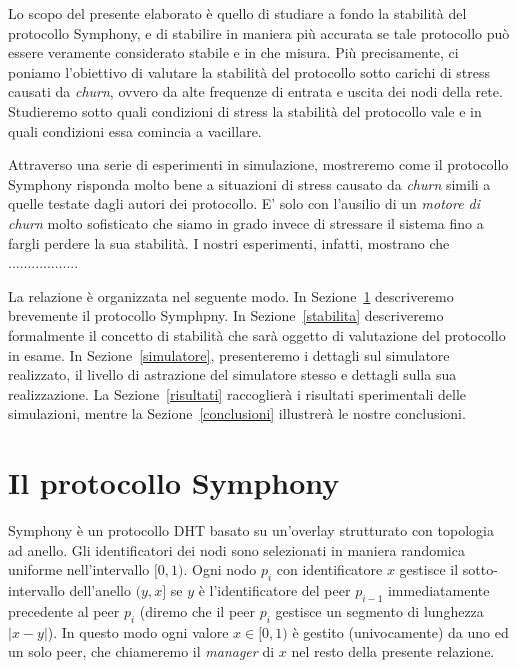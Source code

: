 \documentclass[prodmode,acmtap]{acmlarge}
\begin{document}
Lo scopo del presente elaborato è quello di studiare a fondo la stabilità del protocollo Symphony, e di stabilire in maniera più accurata se tale protocollo può essere veramente considerato stabile e in che misura. Più precisamente, ci poniamo l'obiettivo di valutare la stabilità del protocollo sotto carichi di stress causati da \emph{churn}, ovvero da alte frequenze di entrata e uscita dei nodi della rete. Studieremo sotto quali condizioni di stress la stabilità del protocollo vale e in quali condizioni essa comincia a vacillare.

Attraverso una serie di esperimenti in simulazione, mostreremo come il protocollo Symphony risponda molto bene a situazioni di stress causato da \emph{churn} simili a quelle testate dagli autori dei protocollo. E' solo con l'ausilio di un \emph{motore di churn} molto sofisticato che siamo in grado invece di stressare il sistema fino a fargli perdere la sua stabilità. I nostri esperimenti, infatti, mostrano che ..................

La relazione è organizzata nel seguente modo. In Sezione~\ref{symphony} descriveremo brevemente il protocollo Symphpny. In Sezione~\ref{stabilita} descriveremo formalmente il concetto di stabilità che sarà oggetto di valutazione del protocollo in esame. In Sezione~\ref{simulatore}, presenteremo i dettagli sul simulatore realizzato, il livello di astrazione del simulatore stesso e dettagli sulla sua realizzazione. La Sezione~\ref{risultati} raccoglierà i risultati sperimentali delle simulazioni, mentre la Sezione~\ref{conclusioni} illustrerà le nostre conclusioni.





\section{Il protocollo Symphony} \label{symphony}
Symphony è un protocollo DHT basato su un'overlay strutturato con topologia ad anello. Gli identificatori dei nodi sono selezionati in maniera randomica uniforme nell'intervallo $[0,1)$. Ogni nodo $p_i$ con identificatore $x$ gestisce il sotto-intervallo dell'anello $(y,x]$ se $y$ è l'identificatore del peer $p_{i-1}$ immediatamente precedente al peer $p_i$ (diremo che il peer $p_i$ gestisce un segmento di lunghezza $|x-y|$). In questo modo ogni valore $x \in [0,1)$ è gestito (univocamente) da uno ed un solo peer, che chiameremo il \emph{manager} di $x$ nel resto della presente relazione.
\end{document}

